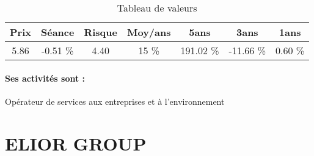 \documentclass[11pt,a4paper]{report}%
\begin{document}
\begin{table}[H]
  \centering
    \begin{tabular}{|c|c|c|c|c|c|c|}
    \hline
    Prix & Séance & Risque  & Moy/ans & 5ans & 3ans & 1ans \\
    \hline
    5.86 &    -0.51 \%    & 4.40 & 15 \% & 191.02 \% & -11.66 \% & 0.60 \% \\
    \hline
    \end{tabular}%
        \label{tab:table_DERICHEBOURG}%
      \caption{Tableau de valeurs}
\end{table}%

\paragraph{Ses activités sont : } Opérateur de services aux entreprises et à l’environnement 
    
    \newpage

\section{ELIOR GROUP}
\end{document}
